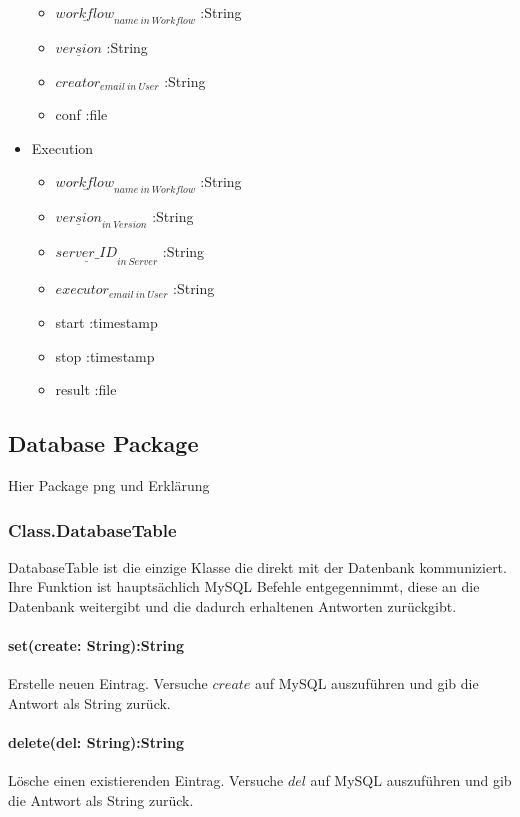 \begin{itemize}[noitemsep]
	\begin{itemize}[noitemsep]
		\item $\underline{workflow}_{name\:in\:Workflow}$ :String
		\item $\underline{version}$ :String
		\item $creator_{email\:in\:User}$ :String
		\item conf :file
	\end{itemize}
	\item Execution
	\begin{itemize}[noitemsep]
		\item $\underline{workflow}_{name\:in\:Workflow}$ :String
		\item $\underline{version}_{in\:Version}$ :String
		\item $\underline{server\_ID}_{in\:Server}$ :String
		\item $executor_{email\:in\:User}$ :String
		\item start :timestamp
		\item stop :timestamp
		\item result :file
	\end{itemize}
\end{itemize}

\subsection{Database Package}

Hier Package png und Erklärung

\subsubsection{Class.DatabaseTable}
DatabaseTable ist die einzige Klasse die direkt mit der Datenbank kommuniziert. Ihre Funktion ist hauptsächlich MySQL Befehle entgegennimmt, diese an die Datenbank weitergibt und die dadurch erhaltenen Antworten zurückgibt.

\paragraph{set(create: String):String} Erstelle neuen Eintrag. Versuche $create$ auf MySQL auszuführen und gib die Antwort als String zurück.

\paragraph{delete(del: String):String} Lösche einen existierenden Eintrag. Versuche $del$ auf MySQL auszuführen und gib die Antwort als String zurück.

